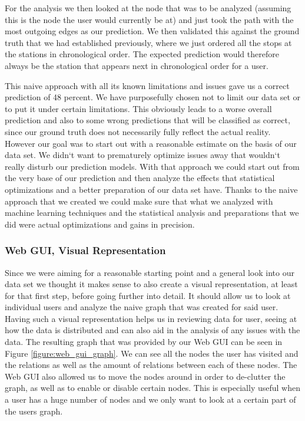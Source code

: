 For the analysis we then looked at the node that was to be analyzed (assuming this is the node the user would currently be at) and just took the path with the most outgoing edges as our prediction. We then validated this against the ground truth that we had established previously, where we just ordered all the stops at the stations in chronological order. The expected prediction would therefore always be the station that appears next in chronological order for a user. 

This naive approach with all its known limitations and issues gave us a correct prediction of 48 percent. We have purposefully chosen not to limit our data set or to put it under certain limitations. This obviously leads to a worse overall prediction and also to some wrong predictions that will be classified as correct, since our ground truth does not necessarily fully reflect the actual reality. However our goal was to start out with a reasonable estimate on the basis of our data set. We didn`t want to prematurely optimize issues away that wouldn`t really disturb our prediction models. With that approach we could start out from the very base of our prediction and then analyze the effects that statistical optimizations and a better preparation of our data set have. Thanks to the naive approach that we created we could make sure that what we analyzed with machine learning techniques and the statistical analysis and preparations that we did were actual optimizations and gains in precision.

\subsubsection{Web GUI, Visual Representation}
\label{subsubsec:web_gui}
Since we were aiming for a reasonable starting point and a general look into our data set we thought it makes sense to also create a visual representation, at least for that first step, before going further into detail. It should allow us to look at individual users and analyze the naive graph that was created for said user. Having such a visual representation helps us in reviewing data for user, seeing at how the data is distributed and can also aid in the analysis of any issues with the data. The resulting graph that was provided by our Web GUI can be seen in Figure \ref{figure:web_gui_graph}. We can see all the nodes the user has visited and the relations as well as the amount of relations between each of these nodes. The Web GUI also allowed us to move the nodes around in order to de-clutter the graph, as well as to enable or disable certain nodes. This is especially useful when a user has a huge number of nodes and we only want to look at a certain part of the users graph.

